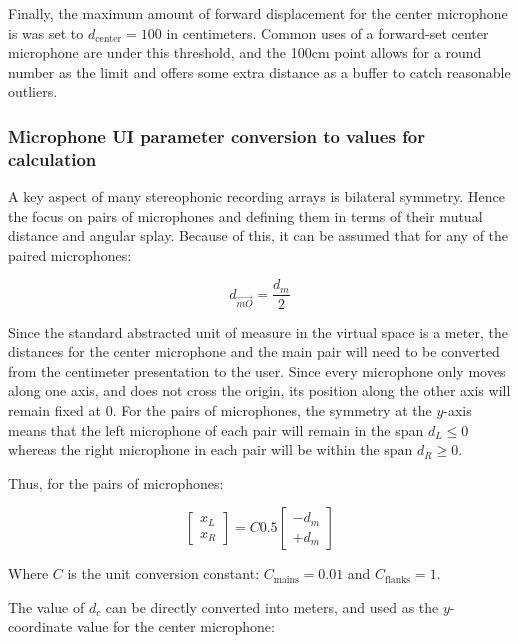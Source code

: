 Finally, the maximum amount of forward displacement for the center microphone is was set to $d_\text{center} = 100$ in centimeters. Common uses of a forward-set center microphone are under this threshold, and the 100cm point allows for a round number as the limit and offers some extra distance as a buffer to catch reasonable outliers.

\subsubsection{Microphone UI parameter conversion to values for calculation}

A key aspect of many stereophonic recording arrays is bilateral symmetry. Hence the focus on pairs of microphones and defining them in terms of their mutual distance and angular splay. Because of this, it can be assumed that for any of the paired microphones:

\begin{equation}
d_{\vec{mO}} = \frac{d_m}{2}
\end{equation}

Since the standard abstracted unit of measure in the virtual space is a meter, the distances for the center microphone and the main pair will need to be converted from the centimeter presentation to the user. Since every microphone only moves along one axis, and does not cross the origin, its position along the other axis will remain fixed at $0$. For the pairs of microphones, the symmetry at the $y$-axis means that the left microphone of each pair will remain in the span $d_L \leq 0$ whereas the right microphone in each pair will be within the span $d_R \geq 0$.

Thus, for the pairs of microphones:

\begin{equation}
\begin{bmatrix} x_L \\ x_R \end{bmatrix} = C0.5 \begin{bmatrix} -d_m \\ +d_m \end{bmatrix}
\end{equation}

Where $C$ is the unit conversion constant: $C_\text{mains} = 0.01$ and $C_\text{flanks} = 1$.

The value of $d_c$ can be directly converted into meters, and used as the $y$-coordinate value for the center microphone:

